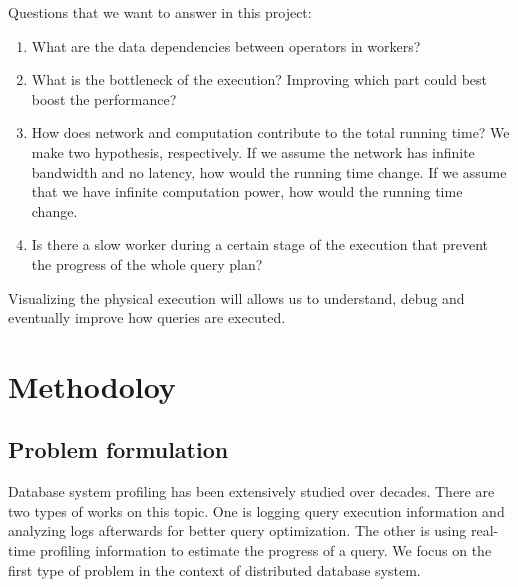 \documentclass[11pt]{article}
\begin{document}
\vspace{10px}

\noindent Questions that we want to answer in this project:

\begin{enumerate}
	\item What are the data dependencies between operators in workers?
	\item What is the bottleneck of the execution? Improving which part could best boost the performance?
	\item How does network and computation contribute to the total running time? We make two hypothesis, respectively. If we assume the network has infinite bandwidth and no latency, how would the running time change. If we assume that we have infinite computation power, how would the running time change.
	\item Is there a slow worker during a certain stage of the execution that prevent the progress of the whole query plan?

\end{enumerate}

Visualizing the physical execution will allows us to understand, debug and eventually improve how queries are executed.

\section{Methodoloy}
\subsection{Problem formulation}
\label{sec:formulation}

Database system profiling has been extensively studied over decades. There are two types of works on this topic. One is logging query execution information and analyzing logs afterwards for better query optimization. The other is using real-time profiling information to estimate the progress of a query. We focus on the first type of problem in the context of distributed database system.
\end{document}
